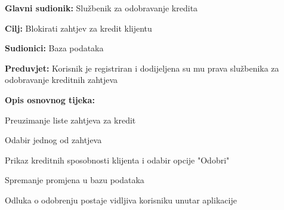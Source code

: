            
                \noindent {}
                \begin{packed_item}
                	
                	\item \textbf{Glavni sudionik: } Službenik za odobravanje kredita
                	\item  \textbf{Cilj:} Blokirati zahtjev za kredit klijentu
                	\item  \textbf{Sudionici:} Baza podataka
                	\item  \textbf{Preduvjet:} Korisnik je registriran i dodijeljena su mu prava službenika za odobravanje kreditnih zahtjeva 
                	\item  \textbf{Opis osnovnog tijeka:}
                	
                	\item[] \begin{packed_enum}
                		
                		\item Preuzimanje liste zahtjeva za kredit
                		\item Odabir jednog od zahtjeva  
                		\item Prikaz kreditnih sposobnosti klijenta i odabir opcije "Odobri"
                		\item Spremanje promjena u bazu podataka
                		\item Odluka o odobrenju postaje vidljiva korisniku unutar aplikacije
                		
                	\end{packed_enum}
                \end{packed_item}
            
